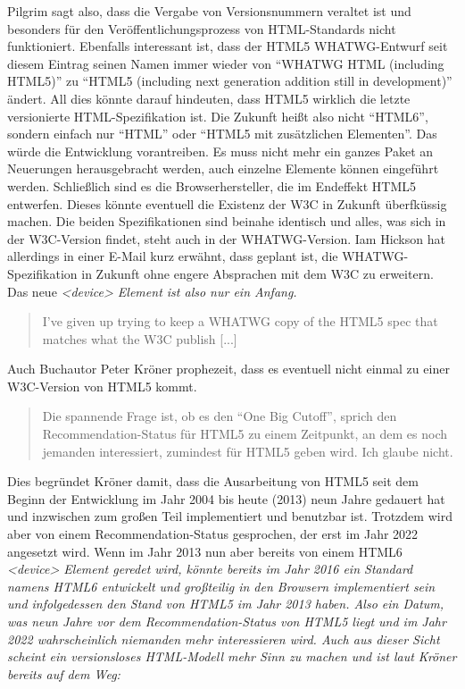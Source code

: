 Pilgrim sagt also, dass die Vergabe von Versionsnummern veraltet ist und
besonders für den Veröffentlichungsprozess von HTML-Standards nicht funktioniert.
Ebenfalls interessant ist, dass der HTML5 WHATWG-Entwurf seit diesem
Eintrag seinen Namen immer wieder von "`WHATWG HTML (including HTML5)"'
zu "`HTML5 (including next generation addition still in development)"' ändert.
\newline\newline
All dies könnte darauf hindeuten, dass HTML5 wirklich die letzte versionierte
HTML-Spezifikation ist. Die Zukunft heißt also nicht "`HTML6"', sondern
einfach nur "`HTML"' oder "`HTML5 mit zusätzlichen Elementen"'. Das
würde die Entwicklung vorantreiben. Es muss nicht mehr ein ganzes
Paket an Neuerungen herausgebracht werden, auch einzelne Elemente
können eingeführt werden. Schließlich sind es die Browserhersteller, die
im Endeffekt HTML5 entwerfen. Dieses könnte eventuell die Existenz
der W3C in Zukunft überfküssig machen. Die beiden Spezifikationen sind
beinahe identisch und alles, was sich in der W3C-Version findet, steht
auch in der WHATWG-Version. Iam Hickson hat allerdings in einer E-Mail
kurz erwähnt, dass geplant ist, die WHATWG-Spezifikation in Zukunft ohne
engere Absprachen mit dem W3C zu erweitern. Das neue \em{<device>}
Element ist also nur ein Anfang.

\begin{quote}
	I've given up trying to keep a WHATWG copy of the
	HTML5 spec that matches what the W3C publish [...]
\end{quote}

Auch Buchautor Peter Kröner prophezeit, dass es eventuell nicht einmal zu
einer W3C-Version von HTML5 kommt.

\begin{quote}
	Die spannende Frage ist, ob es den "`One Big Cutoff"', sprich den
	Recommendation-Status für HTML5 zu einem Zeitpunkt, an dem
	es noch jemanden interessiert, zumindest für HTML5 geben wird.
	Ich glaube nicht.
\end{quote}

Dies begründet Kröner damit, dass die Ausarbeitung von HTML5 seit
dem Beginn der Entwicklung im Jahr 2004 bis heute (2013) neun
Jahre gedauert hat und inzwischen zum großen Teil implementiert
und benutzbar ist. Trotzdem wird aber von einem Recommendation-Status
gesprochen, der erst im Jahr 2022 angesetzt wird. Wenn im Jahr 2013
nun aber bereits von einem HTML6 \em{<device>} Element geredet wird,
könnte bereits im Jahr 2016 ein Standard namens HTML6 entwickelt und
großteilig in den Browsern implementiert sein und infolgedessen den
Stand von HTML5 im Jahr 2013 haben. Also ein Datum, was neun Jahre vor
dem Recommendation-Status von HTML5 liegt und im Jahr 2022 wahrscheinlich
niemanden mehr interessieren wird. Auch aus dieser Sicht scheint ein
versionsloses HTML-Modell mehr Sinn zu machen und ist laut
Kröner bereits auf dem Weg:

